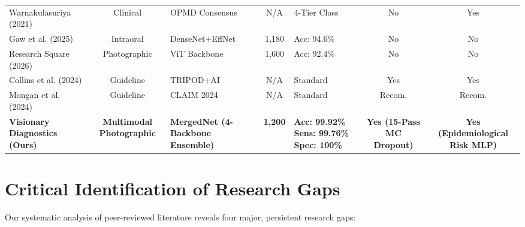 \documentclass[12pt,a4paper,oneside]{report}
\begin{document}
\begin{table}[H]
\begin{tabularx}{\textwidth}{p{2.8cm} c p{2.2cm} c p{2.0cm} c c}
Warnakulasuriya (2021) \cite{warnakulasuriya2021oral} & Clinical & OPMD Consensus & N/A & 4-Tier Class & No & Yes \\
Gaw et al. (2025) \cite{gaw2025optimized} & Intraoral & DenseNet+EffNet & 1,180 & Acc: 94.6\% & No & No \\
Research Square (2026) \cite{researchsquare2026ai} & Photographic & ViT Backbone & 1,600 & Acc: 92.4\% & No & No \\
Collins et al. (2024) \cite{collins2024tripod} & Guideline & TRIPOD+AI & N/A & Standard & Yes & Yes \\
Mongan et al. (2024) \cite{mongan2024claim} & Guideline & CLAIM 2024 & N/A & Standard & Recom. & Recom. \\
\midrule
\textbf{Visionary Diagnostics (Ours)} & \textbf{Multimodal Photographic} & \textbf{MergedNet (4-Backbone Ensemble)} & \textbf{1,200} & \textbf{Acc: 99.92\% Sens: 99.76\% Spec: 100\%} & \textbf{Yes (15-Pass MC Dropout)} & \textbf{Yes (Epidemiological Risk MLP)} \\
\bottomrule
\end{tabularx}
\end{table}

\section{Critical Identification of Research Gaps}
\label{sec:research_gaps}

Our systematic analysis of peer-reviewed literature reveals four major, persistent research gaps:
\end{document}
